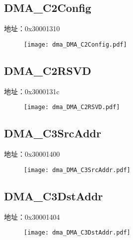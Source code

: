 \subsection{DMA\_C2Config}
\label{dma-DMA-C2Config}
地址：0x30001310
 \begin{figure}[H]
\texttt{[image: dma\_DMA\_C2Config.pdf]}
\end{figure}

\subsection{DMA\_C2RSVD}
\label{dma-DMA-C2RSVD}
地址：0x3000131c
 \begin{figure}[H]
\texttt{[image: dma\_DMA\_C2RSVD.pdf]}
\end{figure}

\subsection{DMA\_C3SrcAddr}
\label{dma-DMA-C3SrcAddr}
地址：0x30001400
 \begin{figure}[H]
\texttt{[image: dma\_DMA\_C3SrcAddr.pdf]}
\end{figure}

\subsection{DMA\_C3DstAddr}
\label{dma-DMA-C3DstAddr}
地址：0x30001404
 \begin{figure}[H]
\texttt{[image: dma\_DMA\_C3DstAddr.pdf]}
\end{figure}

